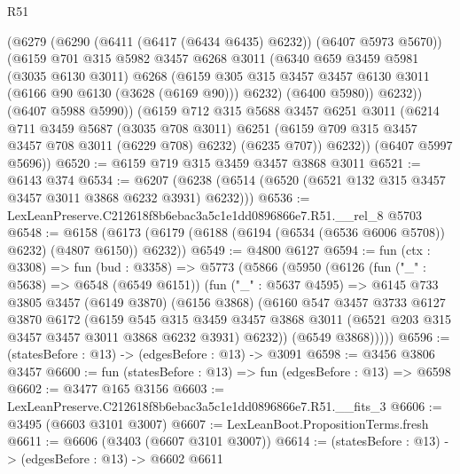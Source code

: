 \begin{lexlean}{R51}
\begin{coremodule}
          (@6279
            (@6290 (@6411 (@6417 (@6434 @6435) @6232)) (@6407 @5973 @5670))
            (@6159
              @701
              @315
              @5982
              @3457
              @6268
              @3011
              (@6340
                @659
                @3459
                @5981
                (@3035 @6130 @3011)
                @6268
                (@6159
                  @305
                  @315
                  @3457
                  @3457
                  @6130
                  @3011
                  (@6166 @90 @6130 (@3628 (@6169 @90)))
                  @6232)
                (@6400 @5980))
              @6232))
          (@6407 @5988 @5990))
        (@6159
          @712
          @315
          @5688
          @3457
          @6251
          @3011
          (@6214
            @711
            @3459
            @5687
            (@3035 @708 @3011)
            @6251
            (@6159 @709 @315 @3457 @3457 @708 @3011 (@6229 @708) @6232)
            (@6235 @707))
          @6232))
      (@6407 @5997 @5696))
@6520 := @6159 @719 @315 @3459 @3457 @3868 @3011
@6521 := @6143 @374
@6534 := @6207 (@6238 (@6514 (@6520 (@6521 @132 @315 @3457 @3457 @3011 @3868 @6232 @3931) @6232)))
@6536 := LexLeanPreserve.C212618f8b6ebac3a5c1e1dd0896866e7.R51.__rel_8 @5703
@6548 := @6158 (@6173 (@6179 (@6188 (@6194 (@6534 (@6536 @6006 @5708)) @6232) (@4807 @6150)) @6232))
@6549 := @4800 @6127
@6594 := fun (ctx : @3308) =>
  fun (bud : @3358) =>
  @5773
    (@5866
      (@5950
        (@6126
          (fun ("_" : @5638) => @6548 (@6549 @6151))
          (fun ("_" : @5637 @4595) =>
          @6145
            @733
            @3805
            @3457
            (@6149 @3870)
            (@6156 @3868)
            (@6160
              @547
              @3457
              @3733
              @6127
              @3870
              @6172
              (@6159
                @545
                @315
                @3459
                @3457
                @3868
                @3011
                (@6521 @203 @315 @3457 @3457 @3011 @3868 @6232 @3931)
                @6232))
            (@6549 @3868)))))
@6596 := (statesBefore : @13) -> (edgesBefore : @13) -> @3091
@6598 := @3456 @3806 @3457
@6600 := fun (statesBefore : @13) => fun (edgesBefore : @13) => @6598
@6602 := @3477 @165 @3156
@6603 := LexLeanPreserve.C212618f8b6ebac3a5c1e1dd0896866e7.R51.__fits_3
@6606 := @3495 (@6603 @3101 @3007)
@6607 := LexLeanBoot.PropositionTerms.fresh
@6611 := @6606 (@3403 (@6607 @3101 @3007))
@6614 := (statesBefore : @13) -> (edgesBefore : @13) -> @6602 @6611

\end{coremodule}
\end{lexlean}
